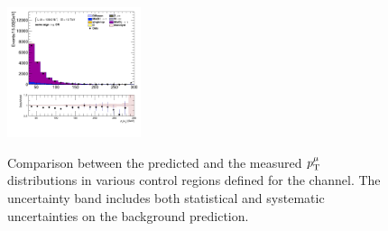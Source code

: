 \begin{figure}[!htp]
\begin{center}
			\includegraphics[width=0.35\textwidth]{chapters/chapter6_HPlus/images/taulep/mu_0_pt_SS_TAUMU.png} \\
			\end{center}
			\caption{
			Comparison between the predicted and the measured $p_{\text{T}}^{\mu}$ distributions in various control regions defined for the \taulep channel. The uncertainty band includes both statistical and systematic uncertainties on the background prediction. 
			}
			\label{fig:bkg-pt-mu-taulep}
		\end{figure}

